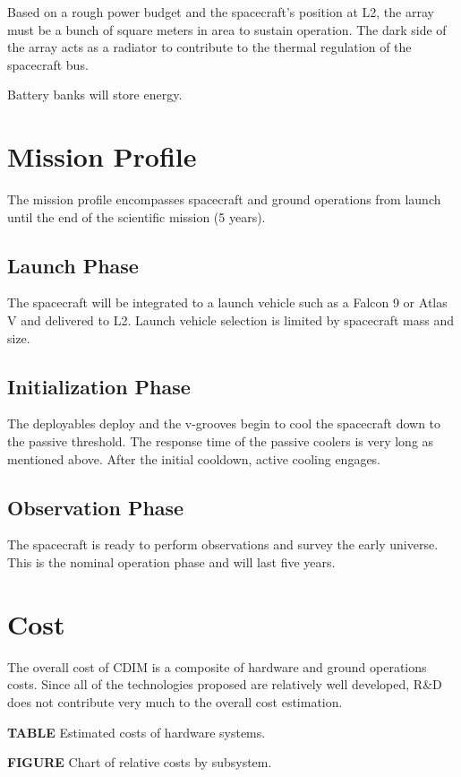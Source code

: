 \documentclass{ws-jai}
\begin{document}
Based on a rough power budget and the spacecraft's position at L2, the array must be a bunch of square meters in area to sustain operation. The dark side of the array acts as a radiator to contribute to the thermal regulation of the spacecraft bus.

Battery banks will store energy.

\section{Mission Profile}
\label{S:mission}
The mission profile encompasses spacecraft and ground operations from launch until the end of the scientific mission (5 years).

\subsection{Launch Phase}
\label{sS:launch}
The spacecraft will be integrated to a launch vehicle such as a Falcon 9 or Atlas V and delivered to L2. Launch vehicle selection is limited by spacecraft mass and size.

\subsection{Initialization Phase}
\label{sS:initphase}
The deployables deploy and the v-grooves begin to cool the spacecraft down to the passive threshold. The response time of the passive coolers is very long as mentioned above. After the initial cooldown, active cooling engages.

\subsection{Observation Phase}
\label{sS:obsphase}
The spacecraft is ready to perform observations and survey the early universe. This is the nominal operation phase and will last five years.

\section{Cost}
\label{S:cost}
The overall cost of CDIM is a composite of hardware and ground operations costs. Since all of the technologies proposed are relatively well developed, R&D does not contribute very much to the overall cost estimation.

\textbf{TABLE} Estimated costs of hardware systems.

\textbf{FIGURE} Chart of relative costs by subsystem.
\end{document}
